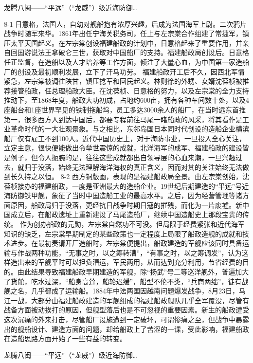 \documentclass[12pt,UTF8]{ctexbook}
\begin{document}
龙腾八闽——“平远”（“龙威”）级近海防御…

8-1
日意格，法国人，自幼对舰船抱有浓厚兴趣，后成为法国海军上尉。二次鸦片战争时随军来华。1861年出任宁海关税务司，任上与左宗棠合作组建了常捷军，镇压太平天国起义。在左宗棠创设福建船政的计划中，日意格起来了重要作用，并亲自回国游说法王拿破仑三世，获取对中国船厂的支持。福建船政局创设后。日意格任正监督，在造船以及人才培养等工作方面，倾注了大量心血，为中国第一家造船厂的创设及最初顺利发展，立下了汗马功劳。
福建船政开工后不久，因西北军情紧急，左宗棠被调往陕甘，镇压捻军和回民起义。林则徐的外甥、女婿沈葆桢被推荐接管船政，任总理船政大臣。在沈葆桢、日意格的努力，以及左宗棠的全力支持推动下，至1868年夏，船政大功初成，占地约600亩，拥有各种车间数十处，以及4座船台和1座世界罕见的铁制拖船坞，员工多达3000余人的船厂，在当时远东首推第一，很多西方人到达中国后，都要专程前往马尾一睹船政的风采，将其看作是工业革命时代的一大壮观景象。与之相比，东邻岛国日本同时代创设的造船企业横滨船厂仅有雇工不到100人。近代中国历史上，对于海防事业，一旦投入全心关注，立定主意，很快便能做出令举世震惊的成就，北洋海军的成军、福建船政的建设皆是例子，但令人扼腕的是，往往这些成就都出自领导层的心血来潮，一旦兴趣过去，就归于没落，始终无法理解海洋海权的真正含义，因而对其的关注始终无法做到长久持之以恒。
8-2
西方铜版画，表现的是福建船政局全景。由左宗棠创始，沈葆桢接办的福建船政，一度是亚洲最大的造船企业。19世纪后期建造的“平远”号近海防御铁甲舰，象征了当时中国造船工业的最高水平。之后，因为经营管理等诸方面原因，船政局归于没落，更经抗日战争时期日寇的摧残，而化为一片废墟。新中国成立后，在船政遗址上重新建设了马尾造船厂，继续中国造船史上那段宝贵的传统。
作为创办船政的元勋，左宗棠自然功不可没。但局限于经费紧张和近代海军知识的缺乏，左宗棠早期制定的某些政策也一定程度上局限了船政造舰的成就和技术进步。在最初奏请开厂造船时，左宗棠便提出，船政建造的军舰应该同时具备运输与作战两种功能，“无事之时，以之筹转漕”，“有事之时，以之筹调发”，认为这样造出来的军舰平时可以担负漕运，军民两用，从而达到充分利用，节省经费的目的。由此结果导致福建船政早期建造的军舰，除“扬武”号二等巡洋舰外，普遍加大了货舱，吃水过深，“船身高耸，船轮迟缓”，船型不伦不类，“兵商两绌”，徒有战舰之名，几乎都成了运输船。1884年中法两国因越南问题爆发战争，8月23日，马江一战，大部分由福建船政建造的军舰组成的福建船政舰队几乎全军覆没，尽管有战备方面被动挨打的原因，但舰型落后也是不可忽视的重要因素。新生的船政遭受这次沉痛的外来打击，尽管船厂设施遭到一定破坏，可谓惨痛之至，但战争中暴露出的舰船设计、建造方面的问题，却给船政上了苦涩的一课，受此影响，福建船政在造船思路方面开始了一些有益的转变。




龙腾八闽——“平远”（“龙威”）级近海防御…
\end{document}
